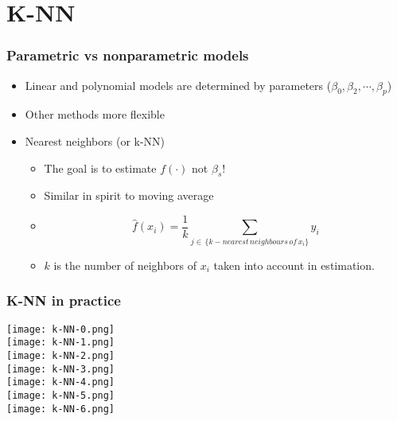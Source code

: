 \documentclass[xcolor=x11names,compress, aspectratio=169]{beamer}
\renewcommand{\(}{\begin{columns}}
\renewcommand{\)}{\end{columns}}
\newcommand{\<}[1]{\begin{column}{#1}}
\renewcommand{\>}{\end{column}}
\begin{document}
\section{K-NN}

\begin{frame} %
\frametitle{Parametric vs nonparametric models}

\begin{itemize}[<+->]
     \item Linear and polynomial models are determined by parameters ($\beta_0, \beta_2, \cdots, \beta_p$)
     \item Other methods more flexible
       \item Nearest neighbors  (or k-NN)
     \begin{itemize}[<+->]
         \item[] The goal is to estimate $f(\cdot)$ not $\beta_s$!
         \item[] Similar in spirit to moving average
         \item[] $$ \widehat{f} (x_i) = \frac{1}{k} \sum_{j \in \, \{ k-nearest\, neighbours \, of \, x_i \} }  y_i$$
         \item[] $k$ is the number of neighbors of $x_i$ taken into account in estimation.
     \end{itemize}
\end{itemize}
\end{frame}


\begin{frame}
\frametitle{\textcolor{brique}{ K-NN in practice}}
\begin{center}
\begin{itemize}
    {\texttt{[image: k-NN-0.png]} \\ }
    {\texttt{[image: k-NN-1.png]} \\ }
    {\texttt{[image: k-NN-2.png]} \\ }
    {\texttt{[image: k-NN-3.png]} \\ }
    {\texttt{[image: k-NN-4.png]} \\ }
    {\texttt{[image: k-NN-5.png]} \\ }
    {\texttt{[image: k-NN-6.png]} \\ }
\end{itemize}
\end{center}
\end{frame}
\end{document}
